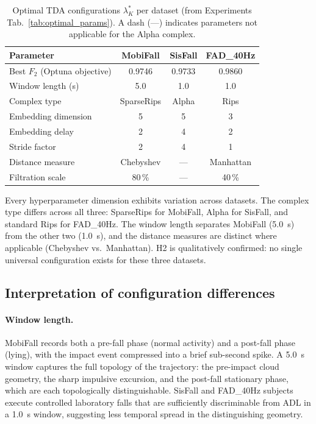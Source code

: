 \documentclass[onluarkali,ingilizce,yukseklisans,karton,LisansustuEgitim]{itutez}
\providecommand{\1}{\mathbf{1}}
\begin{document}
\begin{table}[h!]
\centering
\caption{Optimal TDA configurations $\lambda^*_K$ per dataset (from Experiments
  Tab.~\ref{tab:optimal_params}).  A dash (---) indicates parameters not applicable for
  the Alpha complex.}
\label{tab:optimal_params_ref}
\small
\begin{tabular}{lccc}
\toprule
\textbf{Parameter} & \textbf{MobiFall} & \textbf{SisFall} & \textbf{FAD\_40Hz} \\
\midrule
Best $F_2$ (Optuna objective)  & 0.9746     & 0.9733   & 0.9860      \\
Window length (s)              & 5.0        & 1.0      & 1.0         \\
Complex type                   & SparseRips & Alpha    & Rips        \\
Embedding dimension            & 5          & 5        & 3           \\
Embedding delay                & 2          & 4        & 2           \\
Stride factor                  & 2          & 4        & 1           \\
Distance measure               & Chebyshev  & ---      & Manhattan   \\
Filtration scale               & 80\,\%     & ---      & 40\,\%      \\
\bottomrule
\end{tabular}
\end{table}

Every hyperparameter dimension exhibits variation across datasets.  The complex type
differs across all three: SparseRips for MobiFall, Alpha for SisFall, and standard
Rips for FAD\_40Hz.  The window length separates MobiFall (5.0~s) from the other two
(1.0~s), and the distance measures are distinct where applicable (Chebyshev vs.\
Manhattan).  H2 is qualitatively confirmed: no single universal configuration exists
for these three datasets.

\subsection{Interpretation of configuration differences}

\paragraph{Window length.}
MobiFall records both a pre-fall phase (normal activity) and a post-fall phase (lying),
with the impact event compressed into a brief sub-second spike.  A 5.0~s window captures
the full topology of the trajectory: the pre-impact cloud geometry, the sharp impulsive
excursion, and the post-fall stationary phase, which are each topologically distinguishable.
SisFall and FAD\_40Hz subjects execute controlled laboratory falls that are sufficiently
discriminable from ADL in a 1.0~s window, suggesting less temporal spread in the
distinguishing geometry.
\end{document}
